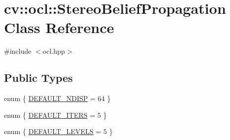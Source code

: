\hypertarget{classcv_1_1ocl_1_1StereoBeliefPropagation}{\section{cv\-:\-:ocl\-:\-:Stereo\-Belief\-Propagation Class Reference}
\label{classcv_1_1ocl_1_1StereoBeliefPropagation}
}


{\ttfamily \#include $<$ocl.\-hpp$>$}

\subsection*{Public Types}
\begin{DoxyCompactItemize}
\item 
enum \{ \hyperlink{classcv_1_1ocl_1_1StereoBeliefPropagation_aa02d6a84051a37f99a7d1744a068004aa38ac82195c986b074c77453f3e4e598f}{D\-E\-F\-A\-U\-L\-T\-\_\-\-N\-D\-I\-S\-P} = 64
 \}
\item 
enum \{ \hyperlink{classcv_1_1ocl_1_1StereoBeliefPropagation_aead7be4ae9ed5fab90b2747a6564640da79d429b6461d0e080bca147f84f0a6d9}{D\-E\-F\-A\-U\-L\-T\-\_\-\-I\-T\-E\-R\-S} = 5
 \}
\item 
enum \{ \hyperlink{classcv_1_1ocl_1_1StereoBeliefPropagation_a2137607ff7d4fb03bbc242bf53e19d7daf111fd69ffacdca367637d0654717711}{D\-E\-F\-A\-U\-L\-T\-\_\-\-L\-E\-V\-E\-L\-S} = 5
 \}
\end{DoxyCompactItemize}
